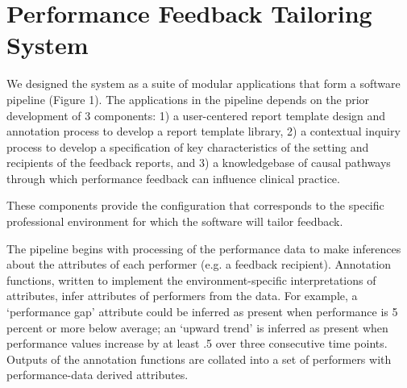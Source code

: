 \documentclass{amia}
\begin{document}
\section*{Performance Feedback Tailoring System}

We designed the system as a suite of modular applications that form a software pipeline (Figure 1). The applications in the pipeline depends on the prior development of 3 components: 1) a user-centered report template design and annotation process to develop a report template library, 2) a contextual inquiry process to develop a specification of key characteristics of the setting and recipients of the feedback reports, and 3) a knowledgebase of causal pathways through which performance feedback can influence clinical practice.



These components provide the configuration that corresponds to the specific professional environment for which the software will tailor feedback.

The pipeline begins with processing of the performance data to make inferences about the attributes of each performer (e.g. a feedback recipient). Annotation functions, written to implement the environment-specific interpretations of attributes, infer attributes of performers from the data. For example, a `performance gap' attribute could be inferred as present when performance is 5 percent or more below average; an `upward trend' is inferred as present when performance values increase by at least .5 over three consecutive time points.
Outputs of the annotation functions are collated into a set of performers with performance-data derived attributes.
\end{document}
